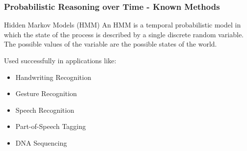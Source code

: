 \begin{frame}[t]
    \frametitle{Probabilistic Reasoning over Time - Known Methods}
  
  \begin{block}{Hidden Markov Models (HMM)}
  	An HMM is a temporal probabilistic model in which the state of the process is described by 
  	\alert{a single discrete} random variable. The possible values of the variable are the possible states of the world.
  \end{block}
  
  \vspace*{1em}
  
  Used successfully in applications like:
  \begin{itemize}
  	\item Handwriting Recognition
  	\item Gesture Recognition
  	\item Speech Recognition
  	\item Part-of-Speech Tagging
  	\item DNA Sequencing
  \end{itemize}
\end{frame}

